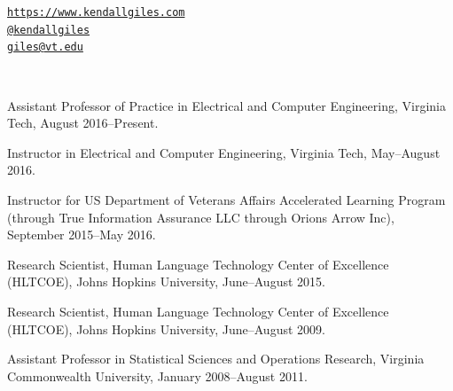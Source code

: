 \documentclass[11pt,article,oneside]{memoir}
\makeatletter
\def\myemail{giles@vt.edu}
\def\myweb{https://www.kendallgiles.com}
\def\mytwitter{@kendallgiles}
\makeatother
\begin{document}
\begin{minipage}[t]{0.595\textwidth}
\end{minipage}
\begin{minipage}[t]{0.400\textwidth}
  \flushright \footnotesize  
  {\scriptsize  \texttt{\href{\myweb}{\myweb}} \, \faGlobe} \\
  {\scriptsize  \texttt{\href{https://twitter.com/kendallgiles}{\mytwitter}} \, \faTwitter }  \\ 
  {\scriptsize  \texttt{\href{mailto:\myemail}{\myemail}} \, \faEnvelope} \\
\end{minipage}

\medskip
 \\
\reversemarginpar
\noindent{\scheader \monthyeardate\today}

\bigskip       


{}

\ind Assistant Professor of Practice in Electrical and Computer Engineering, Virginia Tech, August 2016--Present.      

\ind Instructor in Electrical and Computer Engineering, Virginia Tech, May--August 2016. 

\ind Instructor for US Department of Veterans Affairs Accelerated Learning Program (through True Information Assurance LLC through Orions Arrow Inc), September 2015--May 2016.

\ind Research Scientist, Human Language Technology Center of Excellence (HLTCOE), Johns Hopkins University,  June--August 2015.

\ind Research Scientist, Human Language Technology Center of Excellence (HLTCOE), Johns Hopkins University,  June--August 2009.

\ind Assistant Professor in Statistical Sciences and Operations Research, Virginia Commonwealth University, January 2008--August 2011.
\end{document}
